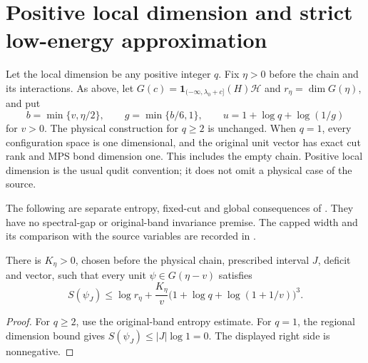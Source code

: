 \section{Positive local dimension and strict low-energy approximation}

Let the local dimension be any positive integer $q$. Fix $\eta>0$ before
the chain and its interactions. As above, let
$G(c)=\mathbf1_{(-\infty,\lambda_0+c]}(H)\mathcal H$ and
$r_\eta=\dim G(\eta)$, and put
\[
    b=\min\{v,\eta/2\},\qquad g=\min\{b/6,1\},\qquad
    u=1+\log q+\log(1/g)
\]
for $v>0$. The physical construction for $q\ge2$ is unchanged.
When $q=1$, every configuration space is one dimensional, and the original
unit vector has exact cut rank and MPS bond dimension one. This includes
the empty chain. Positive local dimension is the usual qudit convention;
it does not omit a physical case of the source.

The following are separate entropy, fixed-cut and global consequences of
\cite[Theorem~thm:al-ld, lines 1096--1105]{Arad2016RigorousRG}.
They have no spectral-gap or original-band invariance premise. The capped
width and its comparison with the source variables are recorded in
\cite{gap:alvv16_low_energy_family_scope}.

\begin{lemma}
    \label{lem:ld_entropy_positive_dimension}
    \leanok
    There is $K_\eta>0$, chosen before the physical chain, prescribed
    interval $J$, deficit and vector, such that every unit
    $\psi\in G(\eta-v)$ satisfies
    \[
        S(\psi_J)\le\log r_\eta+
        \frac{K_\eta}{v}
        \bigl(1+\log q+\log(1+1/v)\bigr)^3.
    \]
\end{lemma}
\begin{proof}\leanok
    For $q\ge2$, use the original-band entropy estimate.
    For $q=1$, the regional dimension bound gives
    $S(\psi_J)\le |J|\log1=0$. The displayed right side is nonnegative.
\end{proof}

